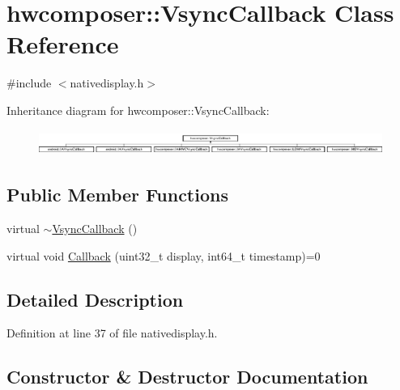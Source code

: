 \hypertarget{classhwcomposer_1_1VsyncCallback}{}\section{hwcomposer\+:\+:Vsync\+Callback Class Reference}
\label{classhwcomposer_1_1VsyncCallback}


{\ttfamily \#include $<$nativedisplay.\+h$>$}

Inheritance diagram for hwcomposer\+:\+:Vsync\+Callback\+:\begin{figure}[H]
\begin{center}
\leavevmode
\includegraphics[height=0.837070cm]{classhwcomposer_1_1VsyncCallback}
\end{center}
\end{figure}
\subsection*{Public Member Functions}
\begin{DoxyCompactItemize}
\item 
virtual \mbox{\hyperlink{classhwcomposer_1_1VsyncCallback_a15ac29d3ff1c41257d6cc2f007604686}{$\sim$\+Vsync\+Callback}} ()
\item 
virtual void \mbox{\hyperlink{classhwcomposer_1_1VsyncCallback_a632ac6a2e13e1b387df9508507a2ed4d}{Callback}} (uint32\+\_\+t display, int64\+\_\+t timestamp)=0
\end{DoxyCompactItemize}


\subsection{Detailed Description}


Definition at line 37 of file nativedisplay.\+h.



\subsection{Constructor \& Destructor Documentation}
\mbox{\label{classhwcomposer_1_1VsyncCallback_a15ac29d3ff1c41257d6cc2f007604686}} 
